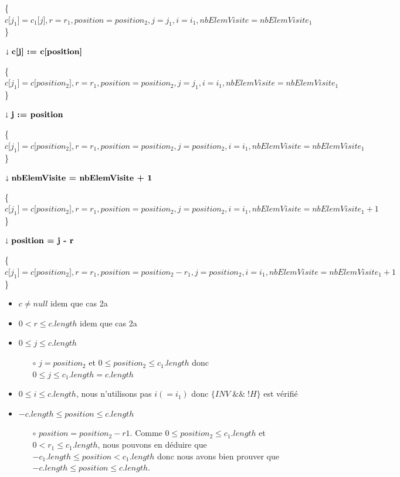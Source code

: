 	\{$c{[}j_1{]}=c_1{[}j{]}, r=r_1, position=position_2, j=j_1,i=i_1, nbElemVisite=nbElemVisite_1$\}\\
	
	\begin{description}
		\item \textbf{$\shortdownarrow \textbf{c{[}j{]} := c{[}position{]}}$}	
	\end{description}	
	
	\{$c{[}j_1{]}=c{[}position_2{]}, r=r_1, position=position_2, j=j_1,i=i_1, nbElemVisite=nbElemVisite_1$\}\\	
	
	\begin{description}
		\item \textbf{$\shortdownarrow \textbf{j := position}$}	
	\end{description}		
	
	\{$c{[}j_1{]}=c{[}position_2{]}, r=r_1, position=position_2, j=position_2,i=i_1, nbElemVisite=nbElemVisite_1$\}\\	
	
	\begin{description}
		\item \textbf{$\shortdownarrow \textbf{nbElemVisite = nbElemVisite + 1}$}	
	\end{description}		
	
	\mbox{\{$c{[}j_1{]}=c{[}position_2{]}, r=r_1, position=position_2, j=position_2,i=i_1, nbElemVisite=nbElemVisite_1 + 1$\}}\\	

	\begin{description}
		\item \textbf{$\shortdownarrow \textbf{position = j - r}$}	
	\end{description}		


	\mbox{\{$c{[}j_1{]}=c{[}position_2{]}, r=r_1, position=position_2 - r_1, j=position_2,i=i_1, nbElemVisite=nbElemVisite_1 + 1$\}}\\	

	\begin{itemize}
		\item $c \neq null$ idem que cas 2a	
		\item $0 < r \leq c.length$ idem que cas 2a
		\item $0 \leq j \leq c.length$
		\begin{itemize}
			\item[$\circ$] $j=position_2$ et $0 \leq position_2 \leq c_1.length$ donc $0 \leq j \leq c_1.length=c.length$	
		\end{itemize}	  
		\item $0 \leq i \leq c.length$, nous n’utilisons pas $i (=i_1)$ donc $\{INV\; \&\&\; !H\}$ est vérifié
		\item $-c.length \leq position \leq c.length$
		\begin{itemize}
			\item[$\circ$] $position=position_2-r1$. Comme $0 \leq position_2 \leq c_1.length$ et $0 < r_1 \leq c_1.length$, nous pouvons en déduire que $-c_1.length \leq position < c_1.length$ donc nous avons bien prouver que $-c.length \leq position \leq c.length$.
		\end{itemize}		
	\end{itemize}				

